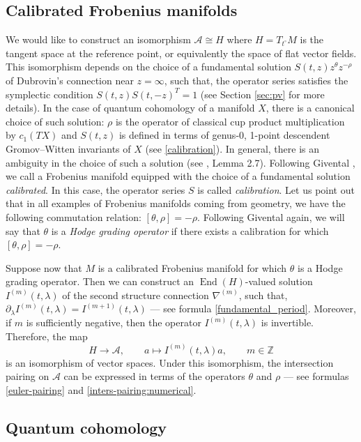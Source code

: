 \documentclass[10pt,a4paper]{article}
\numberwithin{equation}{section}
\newcommand{\ZZ}{\mathbb{Z}}
\newcommand{\op}{\operatorname}
\newcommand{\A}{\mathcal{A}}
\begin{document}
\subsection{Calibrated Frobenius manifolds}\label{sec:cfm}
We would like to construct an isomorphism $\A\cong H$ where
$H=T_{t^\circ}M$ is the tangent space at the reference point, or
equivalently the space of flat vector fields. This isomorphism depends
on the choice of a fundamental solution $S(t,z) z^\theta z^{-\rho}$ of
Dubrovin's connection near $z=\infty$, such that, the operator series
satisfies the symplectic condition $S(t,z) S(t,-z)^T=1$ (see Section
\ref{sec:pv} for more details). In the case of quantum
cohomology of a manifold $X$, there is a canonical choice of such
solution: $\rho$ is the operator of classical cup product
multiplication by $c_1(TX)$ and $S(t,z)$ is defined in terms of
genus-0, 1-point descendent Gromov--Witten invariants of $X$ (see
\eqref{calibration}). In general, there is an ambiguity in the choice of such
a solution (see \cite{Dubrovin1999}, Lemma 2.7). Following Givental
\cite{Givental:qqh}, we call a Frobenius manifold equipped with the
choice of a fundamental solution {\em calibrated}. In this case, the
operator series $S$ is called {\em calibration}. Let us point out that
in all examples of Frobenius
manifolds coming from geometry, we have the following commutation
relation: $[\theta,\rho]=-\rho$. Following Givental again, we will say
that $\theta$ is a {\em Hodge grading operator} if there exists a
calibration for which $[\theta,\rho]=-\rho.$

Suppose now that $M$ is a calibrated Frobenius manifold for which
$\theta$ is a Hodge grading operator. Then we can construct an
$\op{End}(H)$-valued solution $I^{(m)}(t,\lambda)$ of the second structure
connection $\nabla^{(m)}$, such that, $\partial_\lambda
I^{(m)}(t,\lambda)=I^{(m+1)}(t,\lambda) $ --- see formula
\eqref{fundamental_period}. Moreover, if $m$ is sufficiently negative,
then the operator $I^{(m)}(t,\lambda)$ is invertible. Therefore, the
map
\begin{equation}\label{H-periods}
H\to \A,\qquad a\mapsto I^{(m)}(t,\lambda) a, \qquad m\in \ZZ
\end{equation}
is an isomorphism of vector spaces. Under this isomorphism, the
intersection pairing on $\A$ can be expressed in terms of the
operators $\theta$ and $\rho$ --- see formulas \eqref{euler-pairing} and
\eqref{inters-pairing:numerical}.



\subsection{Quantum cohomology}
\end{document}
